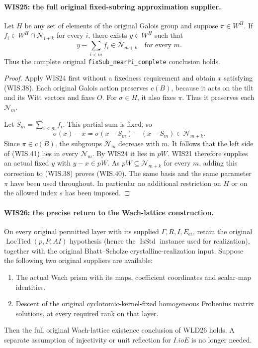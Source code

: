 \documentclass[11pt,a4paper]{article}
\numberwithin{equation}{section}
\theoremstyle{remark}\newtheorem{remark}[theorem]{Remark}
\begin{document}
\paragraph{WIS25: the full original fixed-subring approximation supplier.}
\label{claim:WIS25}
Let $H$ be any set of elements of the original Galois group
and suppose $\pi\in W^H$. If $f_i\in W^H\cap
\mathcal N_{i+k}$ for every $i$, there exists $y\in W^H$
such that
\[
                    y-\sum_{i<m}f_i\in\mathcal N_{m+k}
                               \quad\text{for every }m.  \tag{WIS.40}
\]
Thus the complete original
\texttt{fix\allowbreak Sub\_\allowbreak near\allowbreak Pi\_\allowbreak complete} conclusion holds.

\begin{proof}
Apply WIS24 first without a fixedness requirement
and obtain $x$ satisfying (WIS.38). Each original
Galois action preserves $c(B)$, because it acts
on the tilt and its Witt vectors and fixes $O$.
For $\sigma\in H$, it also fixes $\pi$. Thus it
preserves each $\mathcal N_m$.

Let $S_m=\sum_{i<m}f_i$. This partial sum is fixed, so
\[
              \sigma(x)-x
                =\sigma(x-S_m)-(x-S_m)\in\mathcal N_{m+k}.
 \tag{WIS.41}
\]
Since $\pi\in c(B)$, the subgroups $\mathcal N_m$
decrease with $m$. It follows that the left side
of (WIS.41) lies in every $\mathcal N_m$.
By WIS24 it lies in $pW$. WIS21 therefore supplies
an actual fixed $y$ with $y-x\in pW$.
As $pW\subseteq\mathcal N_{m+k}$ for every $m$,
adding this correction to (WIS.38) proves (WIS.40).
The same basis and the same parameter $\pi$ have
been used throughout. In particular no additional
restriction on $H$ or on the allowed index $s$
has been imposed.
\end{proof}

\paragraph{WIS26: the precise return to the Wach-lattice construction.}
\label{claim:WIS26}
On every original permitted layer with its supplied
$\Gamma,R,I,E_{\mathrm{et}}$, retain the original
$\operatorname{LocTied}(p,P,AI)$ hypothesis (hence the
$\operatorname{IsStd}$ instance used for realization), together
with the original Bhatt--Scholze crystalline-realization input. Suppose
the following two original suppliers are available:
\begin{enumerate}
\item The actual Wach prism with its maps, coefficient
      coordinates and scalar-map identities.
\item Descent of the original cyclotomic-kernel-fixed
      homogeneous Frobenius matrix solutions, at every
      required rank on that layer.
\end{enumerate}
Then the full original Wach-lattice existence conclusion
of WLD26 holds. A separate assumption of injectivity or
unit reflection for $I.ioE$ is no longer needed.
\end{document}
